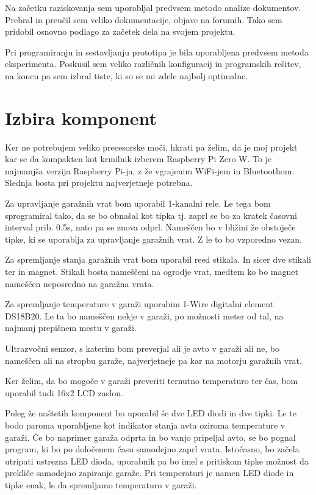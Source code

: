 \documentclass[11pt]{article}
\begin{document}
Na začetku raziskovanja sem uporabljal predvsem metodo analize dokumentov. Prebral in preučil sem veliko dokumentacije, objave na forumih. Tako sem pridobil osnovno podlago za začetek dela na svojem projektu.

Pri programiranju in sestavljanju prototipa je bila uporabljena predvsem metoda eksperimenta. Poskusil sem veliko različnih konfiguracij in programskih rešitev, na koncu pa sem izbral tiste, ki so se mi zdele najbolj optimalne.
\newpage

\section{Izbira komponent}
  Ker ne potrebujem veliko precesorske moči, hkrati pa želim, da je moj projekt kar se da kompakten kot krmilnik izberem Raspberry Pi Zero W. To je najmanjša verzija Raspberry Pi-ja, z že vgrajenim WiFi-jem in Bluetoothom. Slednja bosta pri projektu najverjetneje potrebna.

  Za upravljanje garažnih vrat bom uporabil 1-kanalni rele. Le tega bom sprogramiral tako, da se bo obnašal kot tipka tj. zaprl se bo za kratek časovni interval prib. 0.5s, nato pa se znova odprl. Nameščen bo v bližini že obstoječe tipke, ki se uporablja za upravljanje garažnih vrat. Z le to bo vzporedno vezan.

  Za spremljanje stanja garažnih vrat bom uporabil reed stikala. In sicer dve stikali ter in magnet. Stikali bosta nameščeni na ogrodje vrat, medtem ko bo magnet nameščen neposredno na garažna vrata.

  Za spremljanje temperature v garaži uporabim 1-Wire digitalni element DS18B20. Le ta bo nameščen nekje v garaži, po možnosti meter od tal, na najmanj prepišnem mestu v garaži.

  Ultrazvočni senzor, s katerim bom preverjal ali je avto v garaži ali ne, bo nameščen ali na stropbu garaže, najverjetneje pa kar na motorju garažnih vrat.

  Ker želim, da bo mogoče v garaži preveriti ternutno temperaturo ter čas, bom uporabil tudi 16x2 LCD zaslon.

  Poleg že naštetih komponent bo uporabil še dve LED diodi in dve tipki. Le te bodo paroma uporabljene kot indikator stanja avta oziroma temperature v garaži. Če bo naprimer garaža odprta in bo vanjo pripeljal avto, se bo pognal program, ki bo po določenem času samodejno zaprl vrata. Istočasno, bo začela utripati ustrezna LED dioda, uporabnik pa bo imel s pritiskom tipke možnost da prekliče samodejno zapiranje garaže. Pri temperaturi je namen LED diode in tipke enak, le da spremljamo temperaturo v garaži.
\end{document}
